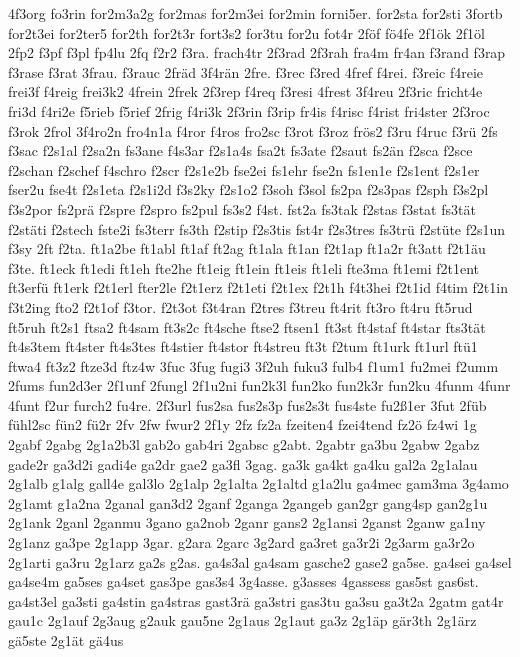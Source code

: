 {4f3org
fo3rin
for2m3a2g
for2mas
for2m3ei
for2min
forni5er.
for2sta
for2sti
3fortb
for2t3ei
for2ter5
for2th
for2t3r
fort3s2
for3tu
for2u
fot4r
2föf
fö4fe
2f1ök
2f1öl
2fp2
f3pf
f3pl
fp4lu
2fq
f2r2
f3ra.
frach4tr
2f3rad
2f3rah
fra4m
fr4an
f3rand
f3rap
f3rase
f3rat
3frau.
f3rauc
2fräd
3f4rän
2fre.
f3rec
f3red
4fref
f4rei.
f3reic
f4reie
frei3f
f4reig
frei3k2
4frein
2frek
2f3rep
f4req
f3resi
4frest
3f4reu
2f3ric
fricht4e
fri3d
f4ri2e
f5rieb
f5rief
2frig
f4ri3k
2f3rin
f3rip
fr4is
f4risc
f4rist
fri4ster
2f3roc
f3rok
2frol
3f4ro2n
fro4n1a
f4ror
f4ros
fro2sc
f3rot
f3roz
frös2
f3ru
f4ruc
f3rü
2fs
f3sac
f2s1al
f2sa2n
fs3ane
f4s3ar
f2s1a4s
fsa2t
fs3ate
f2saut
fs2än
f2sca
f2sce
f2schan
f2schef
f4schro
f2scr
f2s1e2b
fse2ei
fs1ehr
fse2n
fs1en1e
f2s1ent
f2s1er
fser2u
fse4t
f2s1eta
f2s1i2d
f3s2ky
f2s1o2
f3soh
f3sol
fs2pa
f2s3pas
f2sph
f3s2pl
f3s2por
fs2prä
f2spre
f2spro
fs2pul
fs3s2
f4st.
fst2a
fs3tak
f2stas
f3stat
fs3tät
f2stäti
f2stech
fste2i
fs3terr
fs3th
f2stip
f2s3tis
fst4r
f2s3tres
fs3trü
f2stüte
f2s1un
f3sy
2ft
f2ta.
ft1a2be
ft1abl
ft1af
ft2ag
ft1ala
ft1an
f2t1ap
ft1a2r
ft3att
f2t1äu
f3te.
ft1eck
ft1edi
ft1eh
fte2he
ft1eig
ft1ein
ft1eis
ft1eli
fte3ma
ft1emi
f2t1ent
ft3erfü
ft1erk
f2t1erl
fter2le
f2t1erz
f2t1eti
f2t1ex
f2t1h
f4t3hei
f2t1id
f4tim
f2t1in
f3t2ing
fto2
f2t1of
f3tor.
f2t3ot
f3t4ran
f2tres
f3treu
ft4rit
ft3ro
ft4ru
ft5rud
ft5ruh
ft2s1
ftsa2
ft4sam
ft3s2c
ft4sche
ftse2
ftsen1
ft3st
ft4staf
ft4star
fts3tät
ft4s3tem
ft4ster
ft4s3tes
ft4stier
ft4stor
ft4streu
ft3t
f2tum
ft1urk
ft1url
ftü1
ftwa4
ft3z2
ftze3d
ftz4w
3fuc
3fug
fugi3
3f2uh
fuku3
fulb4
f1um1
fu2mei
f2umm
2fums
fun2d3er
2f1unf
2fungl
2f1u2ni
fun2k3l
fun2ko
fun2k3r
fun2ku
4funm
4funr
4funt
f2ur
furch2
fu4re.
2f3url
fus2sa
fus2s3p
fus2s3t
fus4ste
fu2ß1er
3fut
2füb
fühl2sc
fün2
fü2r
2fv
2fw
fwur2
2f1y
2fz
fz2a
fzeiten4
fzei4tend
fz2ö
fz4wi
1g
2gabf
2gabg
2g1a2b3l
gab2o
gab4ri
2gabsc
g2abt.
2gabtr
ga3bu
2gabw
2gabz
gade2r
ga3d2i
gadi4e
ga2dr
gae2
ga3fl
3gag.
ga3k
ga4kt
ga4ku
gal2a
2g1alau
2g1alb
g1alg
gall4e
gal3lo
2g1alp
2g1alta
2g1altd
g1a2lu
ga4mec
gam3ma
3g4amo
2g1amt
g1a2na
2ganal
gan3d2
2ganf
2ganga
2gangeb
gan2gr
gang4sp
gan2g1u
2g1ank
2ganl
2ganmu
3gano
ga2nob
2ganr
gans2
2g1ansi
2ganst
2ganw
ga1ny
2g1anz
ga3pe
2g1app
3gar.
g2ara
2garc
3g2ard
ga3ret
ga3r2i
2g3arm
ga3r2o
2g1arti
ga3ru
2g1arz
ga2s
g2as.
ga4s3al
ga4sam
gasche2
gase2
ga5se.
ga4sei
ga4sel
ga4se4m
ga5ses
ga4set
gas3pe
gas3s4
3g4asse.
g3asses
4gassess
gas5st
gas6st.
ga4st3el
ga3sti
ga4stin
ga4stras
gast3rä
ga3stri
gas3tu
ga3su
ga3t2a
2gatm
gat4r
gau1c
2g1auf
2g3aug
g2auk
gau5ne
2g1aus
2g1aut
ga3z
2g1äp
gär3th
2g1ärz
gä5ste
2g1ät
gä4us
}
